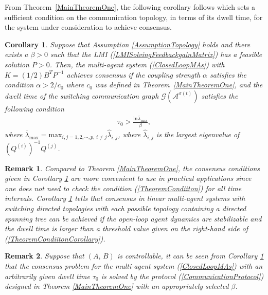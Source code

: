 \documentclass[letterpaper, 10 pt, conference]{ieeeconf}
\newtheorem{remark}{Remark}
\newtheorem{corollary}{Corollary}
\begin{document}
From Theorem~\ref{MainTheoremOne}, the following corollary follows which
sets a sufficient condition on the communication topology, in terms of its
dwell time, for the system under consideration to achieve consensus.

\begin{corollary}\label{CorollaryOne}
Suppose that Assumption \ref{AssumptionTopology} holds and there exists a
$\beta>0$ such that the LMI (\ref{LMISolvingFeedbackgainMatrix})
has a feasible solution $P>0$. Then,
the multi-agent system
(\ref{ClosedLoopMAs}) with $K=(1/2)B^{T}P^{-1}$ achieves consensus if the
coupling strength $\alpha$ satisfies the condition $\alpha>2/c_{0}$ where
$c_{0}$ was defined in Theorem~\ref{MainTheoremOne}, and the dwell time of
the switching communication graph $\mathcal{G}(\mathcal{A}^{\sigma(t)})$
satisfies the following condition
\begin{eqnarray}\label{TheoremCondiitonCorollary}
\tau_{0} >\frac{\mathrm{ln}\overline{\lambda}_{\mathrm{max}}}{\beta},
\end{eqnarray}
where $\overline{\lambda}_{\mathrm{max}}=\mathrm{max}_{i,j=1,2,\cdots,p, \,i\neq j}\widehat{\lambda}_{i,j}$, where $\widehat{\lambda}_{i,j}$ is the largest eigenvalue of $\left(Q^{(i)}\right)^{-1}Q^{(j)}$.
\end{corollary}

\begin{remark}
Compared to Theorem \ref{MainTheoremOne}, the consensus conditions given in
Corollary \ref{CorollaryOne} are
more convenient to use in practical applications since one does not need to
check the condition (\ref{TheoremCondiiton}) for all time intervals.
Corollary \ref{CorollaryOne} tells that consensus in linear multi-agent
systems with switching directed topologies with each possible topology
containing a directed spanning tree can be achieved if the open-loop agent
dynamics are stabilizable and the dwell time is larger than a threshold
value given on the right-hand side of (\ref{TheoremCondiitonCorollary}).
\end{remark}

\begin{remark}\label{ControllableAnyDwelltime}
Suppose that $(A,\,B)$ is controllable,  it can be seen from Corollary
\ref{CorollaryOne} that the
consensus problem
  for the multi-agent system
(\ref{ClosedLoopMAs}) with an arbitrarily given dwell time $\tau_{0}$
is solved by
  the protocol
  (\ref{CommunicationProtocol}) designed in Theorem
\ref{MainTheoremOne} with an appropriately selected $\beta$.
 \end{remark}
\end{document}
